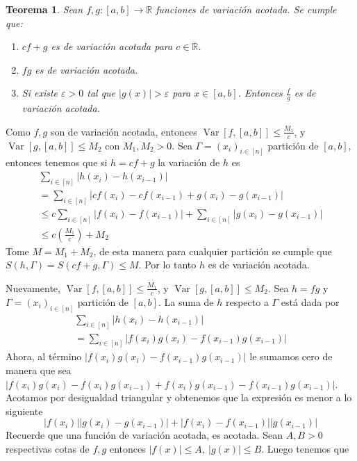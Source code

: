 \documentclass[12pt]{article}
\theoremstyle{plain}
\newtheorem{Th}{Teorema}[subsection]   %
\theoremstyle{definition}
\theoremstyle{remark}
\numberwithin{equation}{section}
\DeclareMathOperator{\Var}{Var}     %
\newcommand{\bR}{\mathbb{R}}        %
\renewcommand{\leq}{\leqslant}      %
\renewcommand{\:}{\colon}           %
\newcommand{\bonj}[1]{\left\lbrack#1\right\rbrack}
\begin{document}
\begin{multicols}{2}
\begin{Th}
  Sean $f,g\colon\bonj{a,b}\to\bR$ funciones de variación acotada. Se cumple que:
  \begin{enumerate}
    \item $cf+g$ es de variación acotada para $c\in\bR$.
    \item $fg$ es de variación acotada.
    \item Si existe $\varepsilon>0$ tal que $|g(x)|>\varepsilon$ para $x\in\bonj{a,b}$. Entonces $\frac{f}{g}$ es de variación acotada.
  \end{enumerate}
\end{Th}

\begin{ptcbp}
 \quad Como $f,g$ son de variación acotada, entonces $\Var\bonj{f,\bonj{a,b}}\leq \frac{M_1}{c}$, y $\Var\bonj{g,\bonj{a,b}}\leq M_2$ con $M_1, M_2>0$. Sea $\Gamma=(x_i)_{i\in\bonj{n}}$ partición de $\bonj{a,b}$, entonces tenemos que si $h=cf+g$ la variación de $h$ es
      \begin{gather*}
        \sum_{i\in\bonj{n}}|h(x_i)-h(x_{i-1})|\\ =\sum_{i\in\bonj{n}}|cf(x_i)-cf(x_{i-1})+g(x_i)-g(x_{i-1})|\\
        \leq c\sum_{i\in\bonj{n}}|f(x_i)-f(x_{i-1})|+\sum_{i\in\bonj{n}}|g(x_i)-g(x_{i-1})|\\
        \leq c\left(\frac{M_1}{c}\right)+M_2
      \end{gather*}
  Tome $M=M_1+M_2$, de esta manera para cualquier partición se cumple que $S(h,\Gamma)=S(cf+g,\Gamma)\leq M$. Por lo tanto $h$ es de variación acotada.\par
 \quad Nuevamente, $\Var\bonj{f,\bonj{a,b}}\leq \frac{M_1}{c}$, y $\Var\bonj{g,\bonj{a,b}}\leq M_2$. Sea $h=fg$ y $\Gamma=(x_i)_{i\in\bonj{n}}$ partición de $\bonj{a,b}$.
      La suma de $h$ respecto a $\Gamma$ está dada por
      \begin{gather*}
        \sum_{i\in\bonj{n}}|h(x_i)-h(x_{i-1})|\\
        =\sum_{i\in\bonj{n}}|f(x_i)g(x_i) - f(x_{i-1})g(x_{i-1})|
      \end{gather*}
      Ahora, al término $
        |f(x_i)g(x_i) - f(x_{i-1})g(x_{i-1})|$ le sumamos cero de manera que sea $
        |f(x_i)g(x_i) - f(x_i)g(x_{i-1})+f(x_i)g(x_{i-1})-f(x_{i-1})g(x_{i-1})|$. Acotamos por desigualdad triangular y obtenemos que la expresión es menor a lo siguiente
        $$|f(x_i)| |g(x_i) - g(x_{i-1})|+|f(x_i)-f(x_{i-1})| |g(x_{i-1})|$$
        Recuerde que una función de variación acotada, es acotada. Sean $A,B>0$ respectivas cotas de $f,g$ entonces $|f(x)|\leq A,\ |g(x)|\leq B$. Luego tenemos que

\end{ptcbp}
\end{multicols}
\end{document}
